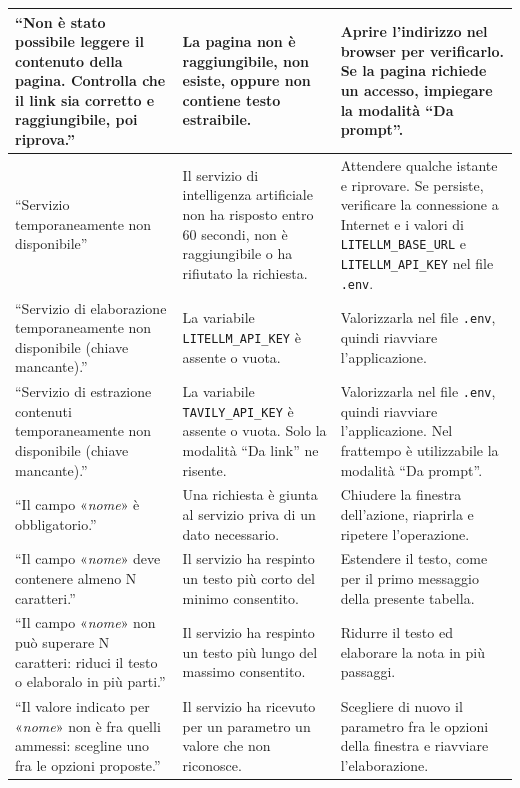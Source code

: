 \documentclass[a4paper, 10pt]{article}
\begin{document}
\begin{longtable}{|p{4.5cm}|p{4.3cm}|p{4.3cm}|}
    ``Non è stato possibile leggere il contenuto della pagina. Controlla che il link sia corretto e raggiungibile, poi riprova.'' & La pagina non è raggiungibile, non esiste, oppure non contiene testo estraibile. & Aprire l'indirizzo nel browser per verificarlo. Se la pagina richiede un accesso, impiegare la modalità ``Da prompt''. \\ \hline

    ``Servizio temporaneamente non disponibile'' & Il servizio di intelligenza artificiale non ha risposto entro 60 secondi, non è raggiungibile o ha rifiutato la richiesta. & Attendere qualche istante e riprovare. Se persiste, verificare la connessione a Internet e i valori di \texttt{LITELLM\_BASE\_URL} e \texttt{LITELLM\_API\_KEY} nel file \texttt{.env}. \\ \hline

    ``Servizio di elaborazione temporaneamente non disponibile (chiave mancante).'' & La variabile \texttt{LITELLM\_API\_KEY} è assente o vuota. & Valorizzarla nel file \texttt{.env}, quindi riavviare l'applicazione. \\ \hline

    ``Servizio di estrazione contenuti temporaneamente non disponibile (chiave mancante).'' & La variabile \texttt{TAVILY\_API\_KEY} è assente o vuota. Solo la modalità ``Da link'' ne risente. & Valorizzarla nel file \texttt{.env}, quindi riavviare l'applicazione. Nel frattempo è utilizzabile la modalità ``Da prompt''. \\ \hline

    ``Il campo «\textit{nome}» è obbligatorio.'' & Una richiesta è giunta al servizio priva di un dato necessario. & Chiudere la finestra dell'azione, riaprirla e ripetere l'operazione. \\ \hline

    ``Il campo «\textit{nome}» deve contenere almeno N caratteri.'' & Il servizio ha respinto un testo più corto del minimo consentito. & Estendere il testo, come per il primo messaggio della presente tabella. \\ \hline

    ``Il campo «\textit{nome}» non può superare N caratteri: riduci il testo o elaboralo in più parti.'' & Il servizio ha respinto un testo più lungo del massimo consentito. & Ridurre il testo ed elaborare la nota in più passaggi. \\ \hline

    ``Il valore indicato per «\textit{nome}» non è fra quelli ammessi: scegline uno fra le opzioni proposte.'' & Il servizio ha ricevuto per un parametro un valore che non riconosce. & Scegliere di nuovo il parametro fra le opzioni della finestra e riavviare l'elaborazione. \\ \hline


\end{longtable}
\end{document}
